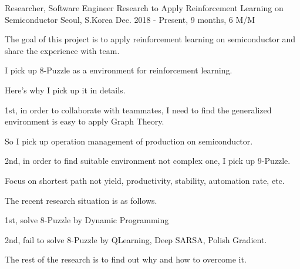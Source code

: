 \begin{cventries}
  \cventry
    {Researcher, Software Engineer} %
    {Research to Apply Reinforcement Learning on Semiconductor} %
    {Seoul, S.Korea} %
    {Dec. 2018 - Present, 9 months, 6 M/M} %
    {
      \begin{cvitems} %
        \item {The goal of this project is to apply reinforcement learning on semiconductor and share the experience with team.}
        \item {I pick up 8-Puzzle as a environment for reinforcement learning.}
        \item {Here's why I pick up it in details.}
        \item {1st, in order to collaborate with teammates, I need to find the generalized environment is easy to apply Graph Theory.}
        \item {So I pick up operation management of production on semiconductor.}
        \item {2nd, in order to find suitable environment not complex one, I pick up 9-Puzzle.}
        \item {Focus on shortest path not yield, productivity, stability, automation rate, etc.}
        \item {The recent research situation is as follows.}
        \item {1st, solve 8-Puzzle by Dynamic Programming}
        \item {2nd, fail to solve 8-Puzzle by QLearning, Deep SARSA, Polish Gradient.}
        \item {The rest of the research is to find out why and how to overcome it.}
      \end{cvitems}
    }

\end{cventries}
